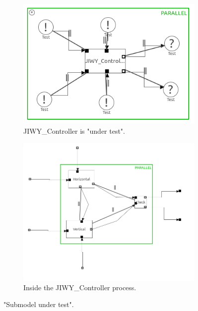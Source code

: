 \documentclass[a4paper,twoside,11pt]{article}
\begin{document}
\begin{figure}
	\begin{subfigure}{0.5\textwidth}
		\centering
		\includegraphics[width=\textwidth]{./images/4-4_overview.png}
		\caption{JIWY\_Controller is "under test".}
		\label{sub:4_4_overview}
	\end{subfigure}
	\begin{subfigure}{0.6\textwidth}
		\centering
		\includegraphics[width=\textwidth]{./images/4-4_controller.png}
		\caption{Inside the JIWY\_Controller process.}
		\label{sub:4_4_controller}
	\end{subfigure}
	\caption{"Submodel under test".}
	\label{fig:4_4_model}
\end{figure}
\end{document}
